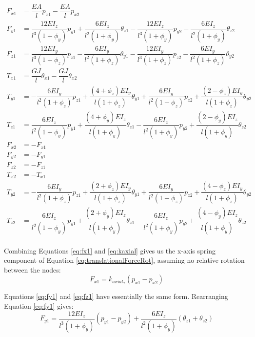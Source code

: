 {\begin{subequations}
\begin{align} 
\label{eq:fx1}
F_{x1} &=  \dfrac{EA}{l}p_{x1} - \dfrac{EA}{l}p_{x2} \\[10pt]
\label{eq:fy1}
F_{y1} &=  \dfrac{12EI_z}{l^3(1+\phi_y)}p_{y1} + \dfrac{6EI_z}{l^2(1+\phi_y)}\theta_{z1} - \dfrac{12EI_z}{l^3(1+\phi_y)}p_{y2} + \dfrac{6EI_z}{l^2(1+\phi_y)}\theta_{z2}\\[10pt]
\label{eq:fz1}
F_{z1} &=  \dfrac{12EI_y}{l^3(1+\phi_z)}p_{z1} - \dfrac{6EI_y}{l^2(1+\phi_z)}\theta_{y1} - \dfrac{12EI_y}{l^3(1+\phi_z)}p_{z2} - \dfrac{6EI_y}{l^2(1+\phi_z)}\theta_{y2}\\[10pt]
\label{eq:tx1}
T_{x1} &=  \dfrac{GJ}{l}\theta_{x1} - \dfrac{GJ}{l}\theta_{x2} \\[10pt]
\label{eq:ty1}
T_{y1} &= - \dfrac{6EI_y}{l^2(1+\phi_z)}p_{z1} + \dfrac{(4+\phi_z)EI_y}{l(1+\phi_z)}\theta_{y1}  + \dfrac{6EI_y}{l^2(1+\phi_z)}p_{z2} + \dfrac{(2-\phi_z)EI_y}{l(1+\phi_z)}\theta_{y2} \\[10pt]
\label{eq:tz1}
T_{z1} &=  \dfrac{6EI_z}{l^2(1+\phi_y)}p_{y1} + \dfrac{(4+\phi_y)EI_z}{l(1+\phi_y)}\theta_{z1}  - \dfrac{6EI_z}{l^2(1+\phi_y)}p_{y2} + \dfrac{(2-\phi_y)EI_z}{l(1+\phi_y)}\theta_{z2} \\[10pt]
\label{eq:fx2}
F_{x2} &=  -F_{x1}\\[10pt]
\label{eq:fy2}
F_{y2} &=  -F_{y1}\\[10pt]
\label{eq:fz2}
F_{z2} &=  -F_{z1}\\[10pt]
\label{eq:tx2}
T_{x2} &=  -T_{x1}\\[10pt]
\label{eq:ty2}
T_{y2} &=  - \dfrac{6EI_y}{l^2(1+\phi_z)}p_{z1} + \dfrac{(2+\phi_z)EI_y}{l(1+\phi_z)}\theta_{y1}  + \dfrac{6EI_y}{l^2(1+\phi_z)}p_{z2} + \dfrac{(4-\phi_z)EI_y}{l(1+\phi_z)}\theta_{y2} \\[10pt]
\label{eq:tz2}
T_{z2} &= \dfrac{6EI_z}{l^2(1+\phi_y)}p_{y1} + \dfrac{(2+\phi_y)EI_z}{l(1+\phi_y)}\theta_{z1}  - \dfrac{6EI_z}{l^2(1+\phi_y)}p_{y2} + \dfrac{(4-\phi_y)EI_z}{l(1+\phi_y)}\theta_{z2}
\end{align}
\end{subequations}\\

Combining Equations \ref{eq:fx1} and \ref{eq:kaxial} gives us the x-axis spring component of Equation \ref{eq:translationalForceRot}, assuming no relative rotation between the nodes:
\[F_{x1} =  k_{axial_x}(p_{x1} - p_{x2}) \]

Equations \ref{eq:fy1} and \ref{eq:fz1} have essentially the same form.  Rearranging Equation \ref{eq:fy1} gives:
\[ F_{y1} =  \dfrac{12EI_z}{l^3(1+\phi_y)} (p_{y1} -p_{y2}) + \dfrac{6EI_z}{l^2(1+\phi_y)}(\theta_{z1} + \theta_{z2}) \]


}
